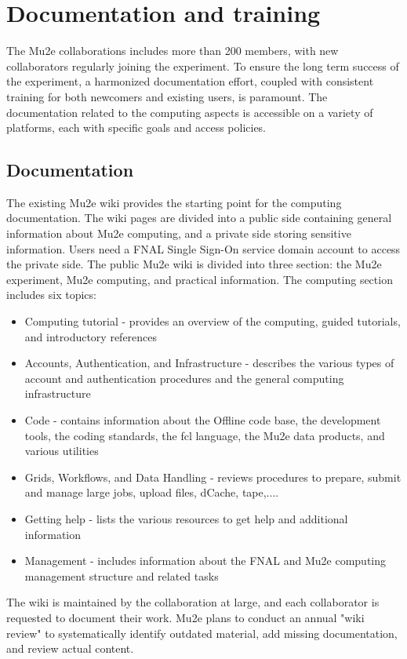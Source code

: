 
\section{Documentation and training}
\label{sec:documentation}

The Mu2e collaborations includes more than 200 members, with new collaborators regularly joining the experiment. To ensure the long term success of the experiment, a harmonized documentation effort, coupled with consistent training for both newcomers and existing users, is paramount. The documentation related to the computing aspects is accessible on a variety of platforms, each with specific goals and access policies.

\subsection{Documentation}

The existing Mu2e wiki provides the starting point for the computing documentation. The wiki pages are divided into a public side containing general information about Mu2e computing, and a private side storing sensitive information. Users need a FNAL Single Sign-On service domain account to access the private side. The public Mu2e wiki is divided into three section: the Mu2e experiment, Mu2e computing, and practical information. The computing section includes six topics:
\begin{itemize}
\item {Computing tutorial -} provides an overview of the computing, guided tutorials, and introductory references
\item {Accounts, Authentication, and Infrastructure -} describes the various types of account and authentication procedures and the general computing infrastructure
\item {Code -} contains information about the Offline code base, the development tools, the coding standards, the fcl language, the Mu2e data products, and various utilities  
\item {Grids, Workflows, and Data Handling -} reviews procedures to prepare, submit and manage large jobs, upload files, dCache, tape,....
\item {Getting help -} lists the various resources to get help and additional information
\item {Management -} includes information about the FNAL and Mu2e computing management structure and related tasks
\end{itemize}
The wiki is maintained by the collaboration at large, and each collaborator is requested to document their work. Mu2e plans to conduct an annual "wiki review" to systematically identify outdated material, add missing documentation, and review actual content. 

